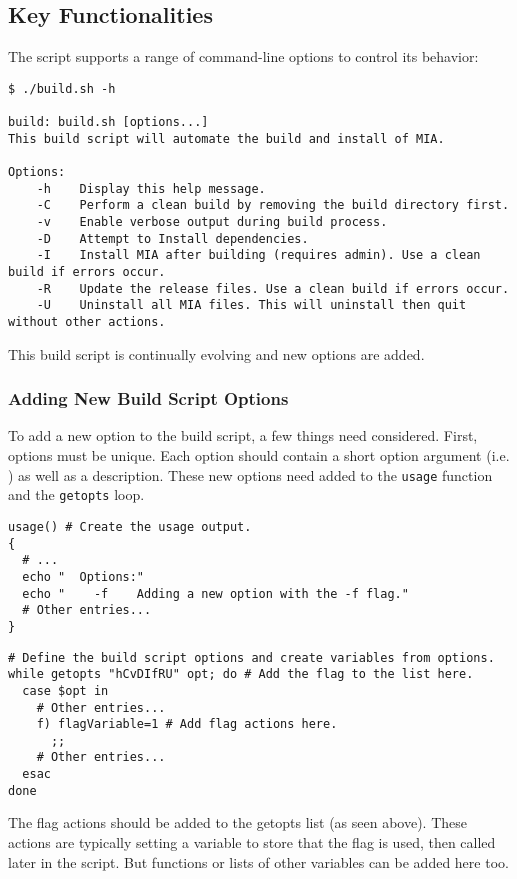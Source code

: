 \subsection{Key Functionalities}

The script supports a range of command-line options to control its behavior:
\begin{lstlisting}[style=terminalstyle]
$ ./build.sh -h

build: build.sh [options...]
This build script will automate the build and install of MIA.

Options:
	-h    Display this help message.
	-C    Perform a clean build by removing the build directory first.
	-v    Enable verbose output during build process.
	-D    Attempt to Install dependencies.
	-I    Install MIA after building (requires admin). Use a clean build if errors occur.
	-R    Update the release files. Use a clean build if errors occur.
	-U    Uninstall all MIA files. This will uninstall then quit without other actions.
\end{lstlisting}
This build script is continually evolving and new options are added.

\subsubsection{Adding New Build Script Options}

To add a new option to the build script, a few things need considered. First, options must be unique. Each option should contain a short option argument (i.e. ) as well as a description. These new options need added to the \texttt{usage} function and the \texttt{getopts} loop.
\begin{lstlisting}[style=shellstyle]
usage() # Create the usage output.
{
  # ...
  echo "  Options:"
  echo "    -f    Adding a new option with the -f flag."
  # Other entries...
}
\end{lstlisting}
\begin{lstlisting}[style=shellstyle]
# Define the build script options and create variables from options.
while getopts "hCvDIfRU" opt; do # Add the flag to the list here.
  case $opt in
    # Other entries...
    f) flagVariable=1 # Add flag actions here.
      ;;
    # Other entries...
  esac
done
\end{lstlisting}
The flag actions should be added to the getopts list (as seen above). These actions are typically setting a variable to store that the flag is used, then called later in the script. But functions or lists of other variables can be added here too.

